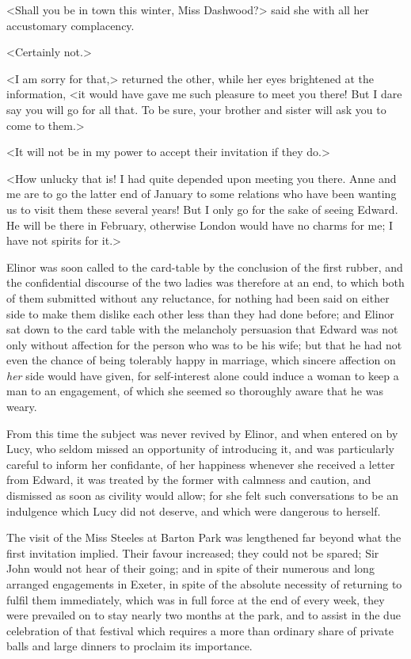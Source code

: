<Shall you be in town this winter, Miss Dashwood?> said she with all her accustomary complacency.

<Certainly not.>

<I am sorry for that,> returned the other, while her eyes brightened at the information, <it would have gave me such pleasure to meet you there! But I dare say you will go for all that. To be sure, your brother and sister will ask you to come to them.>

<It will not be in my power to accept their invitation if they do.>

<How unlucky that is! I had quite depended upon meeting you there. Anne and me are to go the latter end of January to some relations who have been wanting us to visit them these several years! But I only go for the sake of seeing Edward. He will be there in February, otherwise London would have no charms for me; I have not spirits for it.>

Elinor was soon called to the card-table by the conclusion of the first rubber, and the confidential discourse of the two ladies was therefore at an end, to which both of them submitted without any reluctance, for nothing had been said on either side to make them dislike each other less than they had done before; and Elinor sat down to the card table with the melancholy persuasion that Edward was not only without affection for the person who was to be his wife; but that he had not even the chance of being tolerably happy in marriage, which sincere affection on \textit{her} side would have given, for self-interest alone could induce a woman to keep a man to an engagement, of which she seemed so thoroughly aware that he was weary.

From this time the subject was never revived by Elinor, and when entered on by Lucy, who seldom missed an opportunity of introducing it, and was particularly careful to inform her confidante, of her happiness whenever she received a letter from Edward, it was treated by the former with calmness and caution, and dismissed as soon as civility would allow; for she felt such conversations to be an indulgence which Lucy did not deserve, and which were dangerous to herself.

The visit of the Miss Steeles at Barton Park was lengthened far beyond what the first invitation implied. Their favour increased; they could not be spared; Sir John would not hear of their going; and in spite of their numerous and long arranged engagements in Exeter, in spite of the absolute necessity of returning to fulfil them immediately, which was in full force at the end of every week, they were prevailed on to stay nearly two months at the park, and to assist in the due celebration of that festival which requires a more than ordinary share of private balls and large dinners to proclaim its importance.